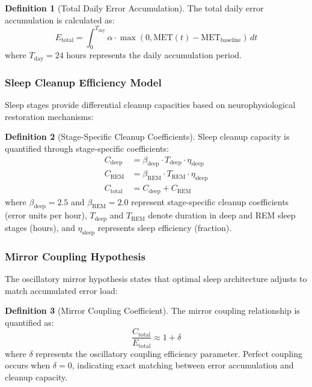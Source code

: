 \documentclass[12pt,a4paper]{article}
\theoremstyle{definition}
\newtheorem{definition}{Definition}[section]
\begin{document}
\begin{definition}[Total Daily Error Accumulation]
The total daily error accumulation is calculated as:
\begin{equation}
E_{\text{total}} = \int_0^{T_{\text{day}}} \alpha \cdot \max(0, \text{MET}(t) - \text{MET}_{\text{baseline}}) \, dt
\label{eq:total_error}
\end{equation}
where $T_{\text{day}} = 24$ hours represents the daily accumulation period.
\end{definition}

\subsubsection{Sleep Cleanup Efficiency Model}

Sleep stages provide differential cleanup capacities based on neurophysiological restoration mechanisms:

\begin{definition}[Stage-Specific Cleanup Coefficients]
Sleep cleanup capacity is quantified through stage-specific coefficients:
\begin{align}
C_{\text{deep}} &= \beta_{\text{deep}} \cdot T_{\text{deep}} \cdot \eta_{\text{sleep}} \\
C_{\text{REM}} &= \beta_{\text{REM}} \cdot T_{\text{REM}} \cdot \eta_{\text{sleep}} \\
C_{\text{total}} &= C_{\text{deep}} + C_{\text{REM}}
\label{eq:cleanup_capacity}
\end{align}
where $\beta_{\text{deep}} = 2.5$ and $\beta_{\text{REM}} = 2.0$ represent stage-specific cleanup coefficients (error units per hour), $T_{\text{deep}}$ and $T_{\text{REM}}$ denote duration in deep and REM sleep stages (hours), and $\eta_{\text{sleep}}$ represents sleep efficiency (fraction).
\end{definition}

\subsubsection{Mirror Coupling Hypothesis}

The oscillatory mirror hypothesis states that optimal sleep architecture adjusts to match accumulated error load:

\begin{definition}[Mirror Coupling Coefficient]
The mirror coupling relationship is quantified as:
\begin{equation}
\frac{C_{\text{total}}}{E_{\text{total}}} \approx 1 + \delta
\label{eq:mirror_coefficient}
\end{equation}
where $\delta$ represents the oscillatory coupling efficiency parameter. Perfect coupling occurs when $\delta = 0$, indicating exact matching between error accumulation and cleanup capacity.
\end{definition}
\end{document}
